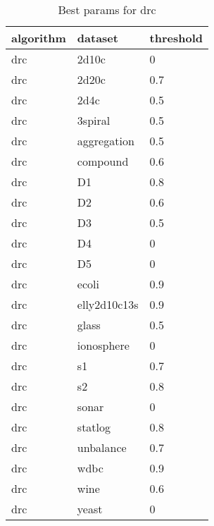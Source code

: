 \clearpage

\begin{table}[H]
\centering
\caption{Best params for drc}
\label{S24_Table}
\begin{tabular}{|l|l|l|}
\hline
algorithm & dataset & threshold \\
\hline
drc & 2d10c & 0 \\
\hline
drc & 2d20c & 0.7 \\
\hline
drc & 2d4c & 0.5 \\
\hline
drc & 3spiral & 0.5 \\
\hline
drc & aggregation & 0.5 \\
\hline
drc & compound & 0.6 \\
\hline
drc & D1 & 0.8 \\
\hline
drc & D2 & 0.6 \\
\hline
drc & D3 & 0.5 \\
\hline
drc & D4 & 0 \\
\hline
drc & D5 & 0 \\
\hline
drc & ecoli & 0.9 \\
\hline
drc & elly2d10c13s & 0.9 \\
\hline
drc & glass & 0.5 \\
\hline
drc & ionosphere & 0 \\
\hline
drc & s1 & 0.7 \\
\hline
drc & s2 & 0.8 \\
\hline
drc & sonar & 0 \\
\hline
drc & statlog & 0.8 \\
\hline
drc & unbalance & 0.7 \\
\hline
drc & wdbc & 0.9 \\
\hline
drc & wine & 0.6 \\
\hline
drc & yeast & 0 \\
\hline
\end{tabular}
\end{table}

\clearpage

